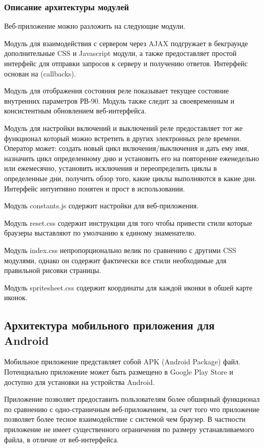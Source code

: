 \subsubsection{ Описание архитектуры модулей}
Веб-приложение можно разложить на следующие модули.

Модуль для взаимодействия с сервером через AJAX подгружает в бекграунде дополнительные CSS и Javascript модули, а также предоставляет простой интерфейс для отправки запросов к серверу и получению ответов. Интерфейс основан на   (callbacks).

Модуль для отображения состояния реле показывает текущее состояние внутренних параметров РВ-90. Модуль также следит за своевременным и консистентным обновлением веб-интерфейса.

Модуль для настройки включений и выключений реле предоставляет тот же функционал который можно встретить в других электронных реле времени. Оператор может: создать новый цикл включения/выключения и дать ему имя, назначить цикл определенному дню и установить его на повторение еженедельно или ежемесячно, установить исключения и переопределить циклы в определенные дни, получить обзор того, какие циклы выполняются в какие дни. Интерфейс интуитивно понятен и прост в использовании.

Модуль constants.js  содержит настройки для веб-приложения.

Модуль reset.css содержит инструкции для того чтобы привести стили которые браузеры выставляют по умолчанию к единому знаменателю.

Модуль index.css непропорционально велик по сравнению с другими CSS модулями, однако он содержит фактически все стили необходимые для правильной рисовки страницы.

Модуль spritesheet.css содержит координаты для каждой иконки в обшей карте иконок.


\newpage
\subsection{Архитектура мобильного приложения для Android}
Мобильное приложение представляет собой APK (Android Package) файл. Потенциально приложение может быть размещено в Google Play Store и доступно для установки на устройства Android.

Приложение позволяет предоставить пользователям более обширный функционал по сравнению с одно-страничным веб-приложением, за счет того что приложение позволяет более тесное взаимодействие с системой чем браузер. В частности приложение не имеет существенного ограничения по размеру устанавливаемого файла, в отличие от веб-интерфейса.

